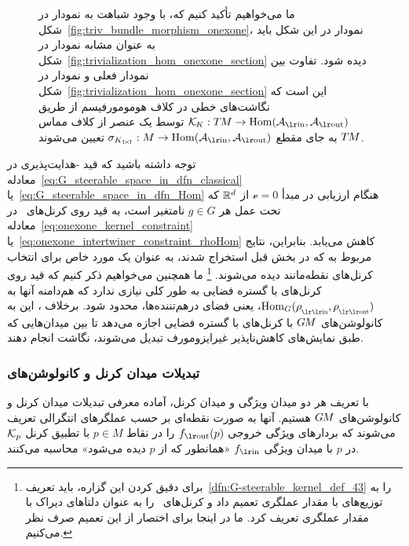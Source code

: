 \begin{figure}
{        ما می‌خواهیم تأکید کنیم که، با وجود شباهت به نمودار در شکل~\ref{fig:triv_bundle_morphism_onexone}، نمودار در این شکل باید به عنوان مشابه نمودار در شکل~\ref{fig:trivialization_hom_onexone_section} دیده شود.
        تفاوت بین نمودار فعلی و نمودار در شکل~\ref{fig:trivialization_hom_onexone_section} این است که نگاشت‌های خطی در کلاف هومومورفیسم از طریق $\KK: \TM\to \Hom(\Ain,\Aout)$ توسط یک عنصر از کلاف مماس $T\mkern-1.5muM$ به جای مقطع $\sigma_{K_{1\!\times\!1}}: M\to \Hom(\Ain,\Aout)$ تعیین می‌شوند.
    }
    \label{fig:triv_kernel_bundle_morphism}
\end{figure}


توجه داشته باشید که قید -هدایت‌پذیری در معادله~\eqref{eq:G_steerable_space_in_dfn_classical} یا~\eqref{eq:G_steerable_space_in_dfn_Hom} هنگام ارزیابی در مبدأ $\mathscr{v}=0$ از $\mathbb{R}^d$ که تحت عمل هر $g\in G$ نامتغیر است، به قید روی کرنل‌های \onexoneGMfarsi\ در معادله~\eqref{eq:onexone_kernel_constraint} یا~\eqref{eq:onexone_intertwiner_constraint_rhoHom} کاهش می‌یابد.
بنابراین، نتایج مربوط به \onexoneGMsfarsi که در بخش قبل استخراج شدند، به عنوان یک مورد خاص برای انتخاب کرنل‌های نقطه‌مانند دیده می‌شوند.%
\footnote{
    برای دقیق کردن این گزاره، باید تعریف~\ref{dfn:G-steerable_kernel_def_43} را به توزیع‌های با مقدار عملگری تعمیم داد و کرنل‌های \onexoneGMfarsi\ را به عنوان دلتاهای دیراک با مقدار عملگری تعریف کرد.
    ما در اینجا برای اختصار از این تعمیم صرف نظر می‌کنیم.
}
ما همچنین می‌خواهیم ذکر کنیم که قید روی کرنل‌های با گستره فضایی به طور کلی نیازی ندارد که هم‌دامنه آنها به $\Hom_G(\rhoin,\rhoout)$، یعنی فضای درهم‌تننده‌ها، محدود شود.
برخلاف \onexoneGMsfarsi، این به کانولوشن‌های $G\mkern-1.4muM$ با کرنل‌های با گستره فضایی اجازه می‌دهد تا بین میدان‌هایی که طبق نمایش‌های کاهش‌ناپذیر غیرایزومورف تبدیل می‌شوند، نگاشت انجام دهند.










\subsubsection{تبدیلات میدان کرنل و کانولوشن‌های }
\label{sec:KFTs_GM-conv_global}

با تعریف هر دو میدان ویژگی و میدان کرنل، آماده معرفی تبدیلات میدان کرنل و کانولوشن‌های $G\mkern-1.4muM$ هستیم.
آنها به صورت نقطه‌ای بر حسب عملگرهای انتگرالی تعریف می‌شوند که بردارهای ویژگی خروجی $\fout(p)$ را در نقاط $p\in M$ با تطبیق کرنل $\mathcal{K}_p$ در $p$ با میدان ویژگی $\fin$ «همانطور که از $p$ دیده می‌شود» محاسبه می‌کنند.

